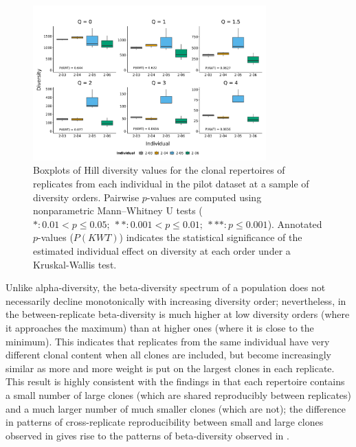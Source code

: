 \begin{figure}
\centering
\includegraphics[width = 0.8\textwidth]{_Figures/png/pilot-clone-diversity-solo-box}
\caption{Boxplots of Hill diversity values for the clonal repertoires of replicates from each individual in the \igseq pilot dataset at a sample of diversity orders. Pairwise $p$-values are computed using nonparametric Mann–Whitney U tests ($*: 0.01 < p \leq 0.05;~**: 0.001 < p \leq 0.01;~***: p \leq 0.001$). Annotated $p$-values ($P(KWT)$) indicates the statistical significance of the estimated individual effect on diversity at each order under a Kruskal-Wallis test.} %
\label{fig:igseq-pilot-clone-diversity-solo-box}
\end{figure}

Unlike alpha-diversity, the beta-diversity spectrum of a population does not necessarily decline monotonically with increasing diversity order; nevertheless, in  the between-replicate beta-diversity is much higher at low diversity orders (where it approaches the maximum) than at higher ones (where it is close to the minimum). This indicates that replicates from the same individual have very different clonal content when all clones are included, but become increasingly similar as more and more weight is put on the largest clones in each replicate. This result is highly consistent with the findings in  that each repertoire contains a small number of large clones (which are shared reproducibly between replicates) and a much larger number of much smaller clones (which are not); the difference in patterns of cross-replicate reproducibility between small and large clones observed in  gives rise to the patterns of beta-diversity observed in .

